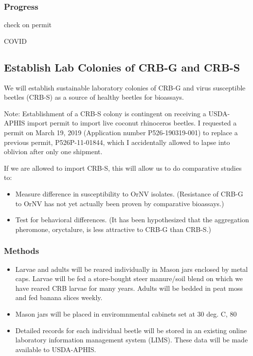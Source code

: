 \documentclass[12pt,letterpaper,english,bibliography=totocnumbered,abstract=on]{scrartcl}
\begin{document}
\subsubsection{Progress}

check on permit

COVID

\newpage
\begin{framed}
\subsection{Establish Lab Colonies of CRB-G and CRB-S}

We will establish sustainable laboratory colonies of CRB-G and virus susceptible beetles (CRB-S) as a source of healthy beetles for bioassays.

Note: Establishment of a CRB-S colony is contingent on receiving a USDA-APHIS import permit to import live coconut rhinoceros beetles. I requested a permit on March 19, 2019 (Application number P526-190319-001) to replace a previous permit, P526P-11-01844, which I accidentally allowed to lapse into oblivion after only one shipment.

If we are allowed to import CRB-S, this will allow us to do comparative studies to:

\begin{itemize}
\item Measure difference in susceptibility to OrNV isolates. (Resistance of CRB-G to OrNV has not yet actually been proven by comparative bioassays.)
\item Test for behavioral differences. (It has been hypothesized that the aggregation pheromone, oryctalure, is less attractive to CRB-G than CRB-S.)
\end{itemize}

\subsubsection{Methods}

\begin{itemize}
	\item Larvae and adults will be reared individually in Mason jars enclosed by metal caps. Larvae will be fed a store-bought steer manure/soil blend on which we have reared CRB larvae for many years. Adults will be bedded in peat moss and fed banana slices weekly.
	\item Mason jars will be placed in enviromnmental cabinets set at 30 deg. C, 80%
	\item Detailed records for each individual beetle will be stored in an existing online laboratory information management system (LIMS). These data will be made available to USDA-APHIS.
\end{itemize}
\end{framed}
\end{document}
